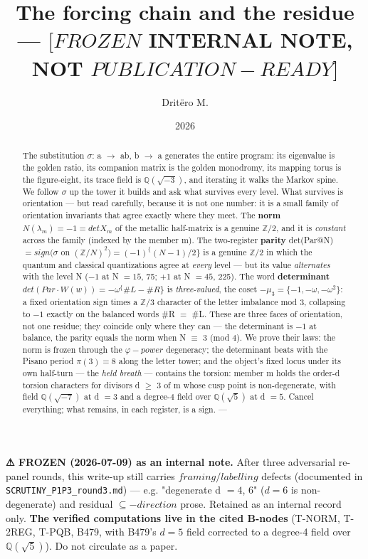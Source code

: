 \documentclass[11pt]{article}
\title{The forcing chain and the residue — \([FROZEN\) INTERNAL NOTE, NOT \(PUBLICATION-READY]\)}
\author{Dritëro M.}
\date{2026}
\theoremstyle{plain}
\theoremstyle{definition}
\theoremstyle{remark}
\begin{document}
\maketitle
\begin{abstract}
The substitution \(\sigma \): a \(\to \) ab, b \(\to \) a generates the entire program: its eigenvalue is the golden ratio, its companion matrix is the golden monodromy, its mapping torus is the figure-eight, its trace field is \(\mathbb{Q}(\sqrt{-3})\), and iterating it walks the Markov spine. We follow \(\sigma \) up the tower it builds and ask what survives every level. What survives is orientation — but read carefully, because it is not one number: it is a small family of orientation invariants that agree exactly where they meet. The \textbf{norm} \(N(\lambda _{m}) = -1 = det X_{m}\) of the metallic half-matrix is a genuine \(\mathbb{Z}/2\), and it is \emph{constant} across the family (indexed by the member m). The two-register \textbf{parity} det(Par@N) \(= sign(\sigma \) on \((\mathbb{Z}/N)^{2}) = (-1)^\{(N-1)/2\}\) is a genuine \(\mathbb{Z}/2\) in which the quantum and classical quantizations agree at \emph{every} level — but its value \emph{alternates} with the level N (\(-1\) at N \(= 15\), 75; +1 at N \(= 45\), 225). The word \textbf{determinant} \(det(Par\cdot W(w)) = -\omega ^\{\#L-\#R\}\) is \emph{three-valued}, the coset \(-\mu _{3} = \{-1, -\omega , -\omega ^{2}\}\): a fixed orientation sign times a \(\mathbb{Z}/3\) character of the letter imbalance mod 3, collapsing to \(-1\) exactly on the balanced words \#R \(=\) \#L. These are three faces of orientation, not one residue; they coincide only where they can — the determinant is \(-1\) at balance, the parity equals the norm when N \(\equiv \) 3 (mod 4). We prove their laws: the norm is frozen through the \(\varphi -power\) degeneracy; the determinant beats with the Pisano period \(\pi (3) = 8\) along the letter tower; and the object's fixed locus under its own half-turn — the \emph{held breath} — contains the torsion: member m holds the order-d torsion characters for divisors d \(\ge \) 3 of m whose cusp point is non-degenerate, with field \(\mathbb{Q}(\sqrt{-7})\) at d \(= 3\) and a degree-4 field over \(\mathbb{Q}(\sqrt{5})\) at d \(= 5\). Cancel everything; what remains, in each register, is a sign.  ---
\end{abstract}
\textbf{⚠ FROZEN (2026-07-09) as an internal note.} After three adversarial re-panel rounds, this write-up still carries \(framing/labelling\) defects (documented in \texttt{SCRUTINY\_P1P3\_round3.md}) — e.g. "degenerate d \(= 4\), 6" (\(d=6\) is non-degenerate) and residual \(\subseteq -direction\) prose. Retained as an internal record only. \textbf{The verified computations live in the cited B-nodes} (T-NORM, T-2REG, T-PQB, B479, with B479's \(d=5\) field corrected to a degree-4 field over \(\mathbb{Q}(\sqrt{5})\)). Do not circulate as a paper.
\end{document}
